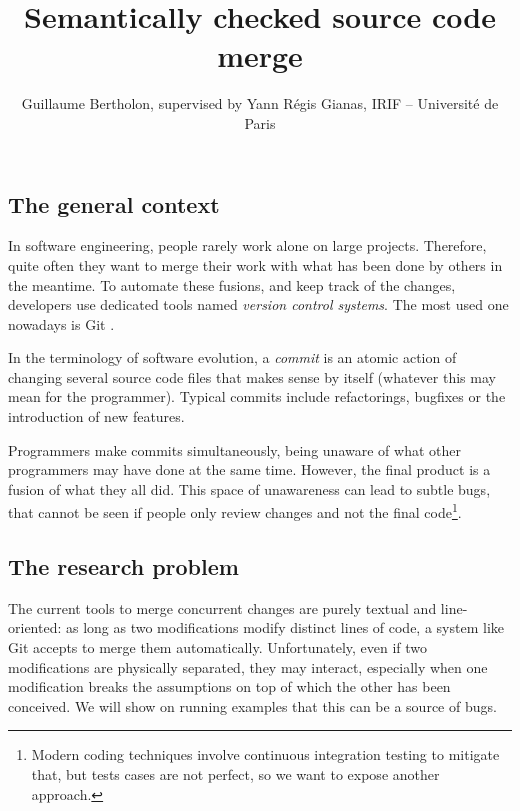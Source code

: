 \documentclass[a4paper,11pt]{article}
\title{Semantically checked source code merge}
\author{Guillaume Bertholon, supervised by Yann Régis Gianas, IRIF -- Université de Paris}
\newcommand\todo[1]{{\color{teal}(\textbf{TODO:} #1)}}
\begin{document}
\maketitle


\subsection*{The general context}


In software engineering, people rarely work alone on large
projects. Therefore, quite often they want to merge their work with
what has been done by others in the meantime.
%
To automate these fusions, and keep track of the changes, developers
use dedicated tools named \textit{version control systems}. The most
used one nowadays is Git \cite{git}.

In the terminology of software evolution, a \textit{commit} is an
atomic action of changing several source code files that makes sense
by itself (whatever this may mean for the programmer). Typical commits
include refactorings, bugfixes or the introduction of new features.

Programmers make commits simultaneously, being unaware of what other
programmers may have done at the same time. However, the final product
is a fusion of what they all did. This space of unawareness can lead
to subtle bugs, that cannot be seen if people only review changes and
not the final code\footnote{Modern coding techniques involve
  continuous integration testing \cite{fowler2006continuous} to
  mitigate that, but tests cases are not perfect, so we want to expose
  another approach.}.

\subsection*{The research problem}


The current tools to merge concurrent changes are purely textual and
line-oriented: as long as two modifications modify distinct lines of
code, a system like Git accepts to merge them
automatically. Unfortunately, even if two modifications are physically
separated, they may interact, especially when one modification breaks
the assumptions on top of which the other has been conceived.  We will
show on running examples that this can be a source of bugs.
\end{document}

